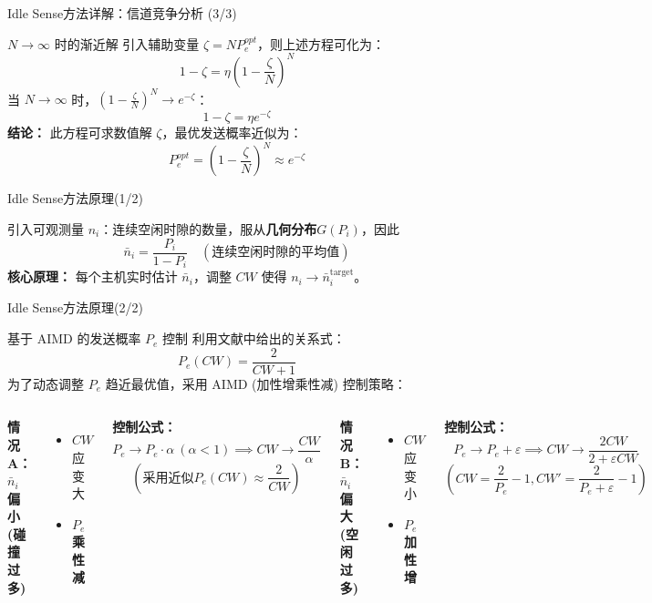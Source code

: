 \documentclass[10pt, aspectratio=169]{beamer}
\begin{document}
\begin{frame}{Idle Sense方法详解：信道竞争分析 (3/3)}
\begin{block}{\(N \to \infty\) 时的渐近解}
    引入辅助变量 \(\zeta = N P_e^{opt}\)，则上述方程可化为：
    \[
    1 - \zeta = \eta \left(1 - \frac{\zeta}{N}\right)^N
    \]
    \vspace{5pt}
    当 \(N \to \infty\) 时，\(\left(1 - \frac{\zeta}{N}\right)^N \to e^{-\zeta}\)：
    \[
    1 - \zeta = \eta e^{-\zeta}
    \]
    \textbf{结论：} 此方程可求数值解 \(\zeta\)，最优发送概率近似为：
    \[
    \boxed{P_e^{opt} = (1 - \frac{\zeta}{N})^N \approx e^{-\zeta}}
    \]
\end{block}
\end{frame}

\begin{frame}{Idle Sense方法原理(1/2)}
\begin{block}{引入可观测量}
    \(n_i\)：连续空闲时隙的数量，服从\textbf{几何分布}$G(P_i)$，因此
    \[
    \bar{n}_i = \frac{P_i}{1 - P_i} \quad (\text{连续空闲时隙的平均值})
    \]
    \textbf{核心原理：} 每个主机实时估计 \(\bar{n}_i\)，调整 \(CW\) 使得 \(n_i \to \bar{n}_i^{\text{target}}\)。
\end{block}
\end{frame}

\begin{frame}{Idle Sense方法原理(2/2)}
\begin{block}{基于 AIMD 的发送概率 \(P_e\) 控制}
    利用文献中给出的关系式：
    \[P_e(CW)=\frac{2}{CW+1}\]
    为了动态调整 \(P_e\) 趋近最优值，采用 AIMD (加性增乘性减) 控制策略：
    \begin{columns}
        \centering
        \textbf{情况 A：\(\bar{n}_i\) 偏小 (碰撞过多)}
        \begin{itemize}
            \item[\(\implies\)] \(CW\) 应变大
            \item[\(\implies\)] \(P_e\) \textbf{乘性减} 
        \end{itemize}
        \textbf{控制公式：}
        \[
        P_e \rightarrow P_e \cdot \alpha \ (\alpha < 1) \implies CW \rightarrow \frac{CW}{\alpha}
        \]
        \[\left(\text{采用近似}P_e(CW)\approx \frac{2}{CW}\right)\]
        
        \centering
        \textbf{情况 B：\(\bar{n}_i\) 偏大 (空闲过多)}
        \begin{itemize}
            \item[\(\implies\)] \(CW\) 应变小
            \item[\(\implies\)] \(P_e\) \textbf{加性增}
        \end{itemize}
        \textbf{控制公式：}
        \[
        P_e \rightarrow P_e + \varepsilon \implies CW \rightarrow \frac{2 CW}{2 + \varepsilon CW}
        \]
        \[\left(CW=\frac{2}{P_e}-1,CW'=\frac{2}{P_e+\varepsilon}-1\right)\]
    \end{columns}
    \vspace{5pt}
\end{block}
\end{frame}
\end{document}
